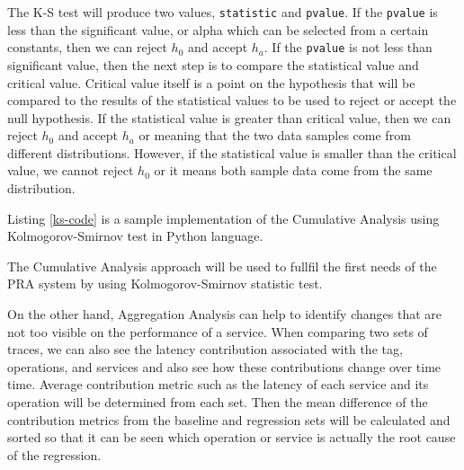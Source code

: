 \documentclass[conference]{configs/IEEEtran}
\begin{document}
The K-S test will produce two values, \texttt{statistic} and \texttt{pvalue}. If the \texttt{pvalue} is less than the significant value, or alpha which can be selected from a certain constants,
then we can reject $h_{0}$ and accept $h_{a}$. If the \texttt{pvalue} is not less than significant value, then the next step is to compare the statistical value and critical value. Critical value itself is a point on the hypothesis that will be compared to the results of the statistical values to be used to reject or accept the null hypothesis. If the statistical value is greater than critical value, then we can reject $h_{0}$ and accept $h_{a}$ or meaning that the two data samples come from different distributions. However, if the statistical value is smaller than the critical value, we cannot reject $h_{0}$ or it means both sample data come from the same distribution.


Listing \ref{ks-code} is a sample implementation of the Cumulative Analysis using Kolmogorov-Smirnov test in Python language.



The Cumulative Analysis approach will be used to fullfil the first needs of the PRA system by using Kolmogorov-Smirnov statistic test.

On the other hand, Aggregation Analysis can help to identify changes that are not too visible on the performance of a service. When comparing two sets of traces, we can also see the latency contribution associated with the tag,
operations, and services and also see how these contributions change over time time. Average contribution metric
such as the latency of each service and its operation will be determined from each set. Then the mean difference of the contribution metrics from the baseline and regression sets
will be calculated and sorted so that it can be seen which operation or service is actually the root cause of the regression.
\end{document}
